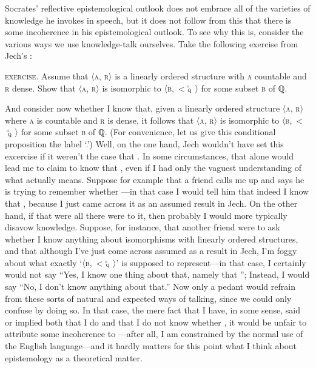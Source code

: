 \documentclass[11pt,letterpaper,oneside]{amsart} %
\begin{document}
Socrates' reflective epistemological outlook does not embrace all of the varieties of knowledge he invokes in speech, but it does not follow from this that there is some incoherence in his epistemological outlook. To see why this is, consider the various ways we use knowledge-talk ourselves. Take the following exercise from Jech's :\begin{squote}\textsc{exercise}. Assume that \textsf{〈}\textsc{a, r}\textsf{〉} is a linearly ordered structure with \textsc{a} countable and \textsc{r} dense. Show that \textsf{〈}\textsc{a, r}\textsf{〉} is isomorphic to \textsf{〈}\textsc{b,~<}{\kern-2pt}$\begin{smallmatrix}_{\circ}\ \\\text{\textsc{q}}\end{smallmatrix}${\kern-3pt}\textsf{〉} for some subset \textsc{b} of \footnotesize\textsf{ℚ}\normalsize.\end{squote}And consider now whether I know that, given a linearly ordered structure \textsf{〈}\textsc{a, r}\textsf{〉} where \textsc{a} is countable and \textsc{r} is dense, it follows that \textsf{〈}\textsc{a, r}\textsf{〉} is isomorphic to \textsf{〈}\textsc{b,~<}{\kern-2pt}$\begin{smallmatrix}_{\circ}\ \\\text{\textsc{q}}\end{smallmatrix}${\kern-3pt}\textsf{〉} for some subset \textsc{b} of \footnotesize\textsf{ℚ}\normalsize. (For convenience, let us give this conditional proposition the label `.') Well, on the one hand, Jech wouldn't have set this excercise if it weren't the case that . In some circumstances, that alone would lead me to claim to know that , even if I had only the vaguest understanding of what  actually means. Suppose for example that a friend calls me up and says he is trying to remember whether ---in that case I would tell him that indeed I know that , because I just came across it as an assumed result in Jech. On the other hand, if that were all there were to it, then probably I would more typically disavow knowledge. Suppose, for instance, that another friend were to ask whether I know anything about isomorphisms with linearly ordered structures, and that although I've just come across  assumed as a result in Jech, I'm foggy about what exactly `\textsf{〈}\textsc{b,~<}{\kern-2pt}$\begin{smallmatrix}_{\circ}\ \\\text{\textsc{q}}\end{smallmatrix}${\kern-3pt}\textsf{〉}' is supposed to represent---in that case, I certainly would not say ``Yes, I know one thing about that, namely that ''; Instead, I would say ``No, I don't know anything about that.'' Now only a pedant would refrain from these sorts of natural and expected ways of talking, since we could only confuse by doing so. In that case, the mere fact that I have, in some sense, said or implied both that I do and that I do not know whether , it would be unfair to attribute some incoherence to ---after all, I am constrained by the normal use of the English language---and it hardly matters for this point what I think about epistemology as a theoretical matter.
\end{document}
